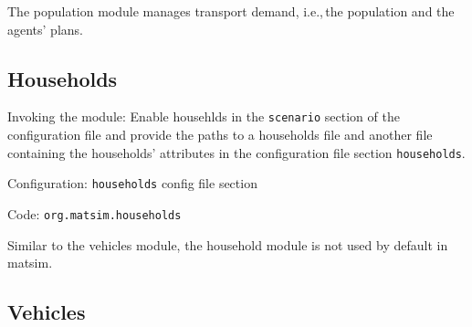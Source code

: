 The population module manages transport demand, i.e.,\,the population and the agents' plans.
\subsection{Households}
\label{sec:households}
\begin{compactitem}
\item Invoking the module: Enable househlds in the \lstinline|scenario| section of the configuration file and provide the paths to a households file and another file containing the households' attributes in the configuration file section \lstinline|households|.
\item Configuration: \lstinline|households| config file section
\item Code: \lstinline|org.matsim.households|
\end{compactitem}

Similar to the vehicles module, the household module is not used by default in \gls{matsim}.

\subsection{Vehicles}
\label{sec:vehicles}


